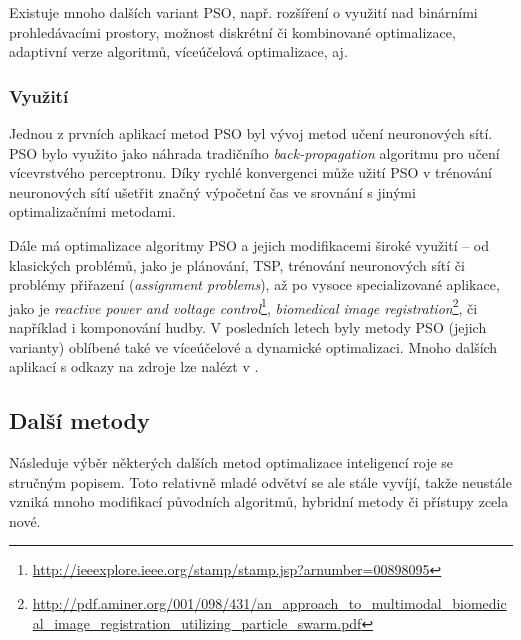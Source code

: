 \documentclass[a4paper,12pt]{article}
\begin{document}
\medskip

Existuje mnoho dalších variant PSO, např. rozšíření o využití nad binárními prohledávacími prostory, možnost
diskrétní či kombinované optimalizace, adaptivní verze algoritmů, víceúčelová optimalizace, aj.


\subsubsection{Využití}
Jednou z prvních aplikací metod PSO byl vývoj metod učení neuronových sítí. PSO bylo využito jako náhrada
tradičního {\it back-propagation} algoritmu pro učení vícevrstvého perceptronu. Díky rychlé konvergenci může
užití PSO v trénování neuronových sítí ušetřit značný výpočetní čas ve srovnání s jinými
optimalizačními metodami.

Dále má optimalizace algoritmy PSO a jejich modifikacemi široké využití -- od klasických problémů,
jako je plánování, TSP,
trénování neuronových sítí či problémy přiřazení ({\it assignment problems}), až po vysoce
specializované aplikace, jako je {\it reactive power and voltage
control}\footnote{\url{http://ieeexplore.ieee.org/stamp/stamp.jsp?arnumber=00898095}},
{\it biomedical image registration}\footnote{\url{http://pdf.aminer.org/001/098/431/an_approach_to_multimodal_biomedical_image_registration_utilizing_particle_swarm.pdf}},
či například i komponování hudby. V posledních letech byly metody PSO (jejich varianty) oblíbené také ve víceúčelové
a dynamické optimalizaci. Mnoho dalších aplikací s odkazy na zdroje lze nalézt v \cite{Blum08SwarmOpt}.

\subsection{Další metody}
Následuje výběr některých dalších metod optimalizace inteligencí roje se stručným popisem. Toto relativně mladé
odvětví se ale stále vyvíjí, takže neustále vzniká mnoho modifikací původních algoritmů, hybridní metody či
přístupy zcela nové.
\end{document}
